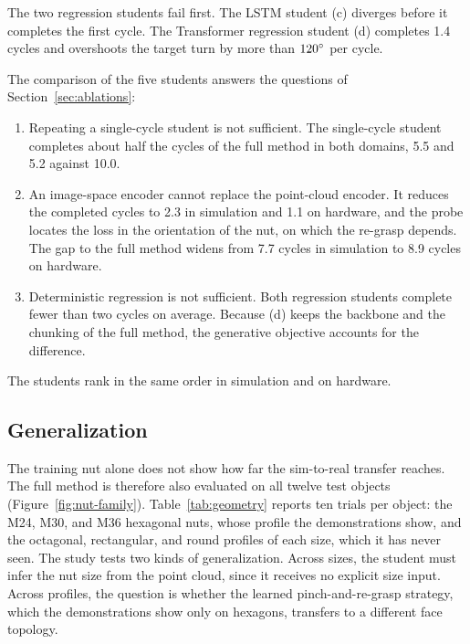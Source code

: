 The two regression students fail first. The \ac{LSTM} student (c) diverges before it completes the first cycle. The Transformer regression student (d) completes 1.4 cycles and overshoots the target turn by more than $120^\circ$ per cycle.

The comparison of the five students answers the questions of Section~\ref{sec:ablations}:
\begin{enumerate}
  \item[(i)] Repeating a single-cycle student is not sufficient. The single-cycle student completes about half the cycles of the full method in both domains, 5.5 and 5.2 against 10.0.
  \item[(ii)] An image-space encoder cannot replace the point-cloud encoder. It reduces the completed cycles to 2.3 in simulation and 1.1 on hardware, and the probe locates the loss in the orientation of the nut, on which the re-grasp depends. The gap to the full method widens from 7.7 cycles in simulation to 8.9 cycles on hardware.
  \item[(iii)] Deterministic regression is not sufficient. Both regression students complete fewer than two cycles on average. Because (d) keeps the backbone and the chunking of the full method, the generative objective accounts for the difference.
\end{enumerate}
The students rank in the same order in simulation and on hardware.

\subsection{Generalization}\label{sec:geometry}

The training nut alone does not show how far the sim-to-real transfer reaches. The full method is therefore also evaluated on all twelve test objects (Figure~\ref{fig:nut-family}). Table~\ref{tab:geometry} reports ten trials per object: the M24, M30, and M36 hexagonal nuts, whose profile the demonstrations show, and the octagonal, rectangular, and round profiles of each size, which it has never seen. The study tests two kinds of generalization. Across sizes, the student must infer the nut size from the point cloud, since it receives no explicit size input. Across profiles, the question is whether the learned pinch-and-re-grasp strategy, which the demonstrations show only on hexagons, transfers to a different face topology.

